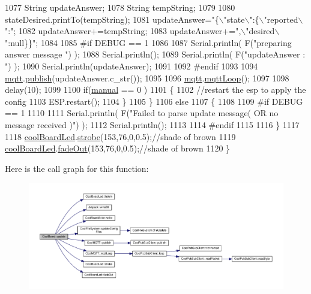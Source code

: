 \begin{DoxyCode}
1077             String updateAnswer;
1078             String tempString;
1079             
1080             stateDesired.printTo(tempString);
1081             updateAnswer=\textcolor{stringliteral}{"\{\(\backslash\)"state\(\backslash\)":\{\(\backslash\)"reported\(\backslash\)":"};
1082             updateAnswer+=tempString;
1083             updateAnswer+=\textcolor{stringliteral}{",\(\backslash\)"desired\(\backslash\)":null\}\}"};
1084 
1085 \textcolor{preprocessor}{        #if DEBUG == 1}
1086 
1087             Serial.println( F(\textcolor{stringliteral}{"preparing answer message "}) );
1088             Serial.println();
1089             Serial.println( F(\textcolor{stringliteral}{"updateAnswer : "}) );
1090             Serial.println(updateAnswer);
1091         
1092 \textcolor{preprocessor}{        #endif  }
1093 
1094             \hyperlink{class_cool_board_a2399f44d7c23c1149a335cb3b46d90f1}{mqtt}.\hyperlink{class_cool_m_q_t_t_ace977b3e90ab14b1199fe5c4fb0a13ec}{publish}(updateAnswer.c\_str());
1095             
1096             \hyperlink{class_cool_board_a2399f44d7c23c1149a335cb3b46d90f1}{mqtt}.\hyperlink{class_cool_m_q_t_t_aa5eaae967b562b62cbcf2b8d81f6e5d5}{mqttLoop}();
1097 
1098             delay(10);
1099         
1100             \textcolor{keywordflow}{if}(\hyperlink{class_cool_board_a7c8e505a5804b109e112d5a03df6ea2b}{manual} == 0 )
1101             \{
1102                 \textcolor{comment}{//restart the esp to apply the config}
1103                 ESP.restart();
1104             \}
1105     \}
1106     \textcolor{keywordflow}{else}
1107     \{
1108     
1109 \textcolor{preprocessor}{    #if DEBUG == 1}
1110 
1111         Serial.println( F(\textcolor{stringliteral}{"Failed to parse update message( OR no message received )"}) );
1112         Serial.println();
1113     
1114 \textcolor{preprocessor}{    #endif}
1115     
1116     \}
1117 
1118     \hyperlink{class_cool_board_a1b1d3c684a5baa56b08486e192fd8e97}{coolBoardLed}.\hyperlink{class_cool_board_led_ad5f0de4c628cbfbf49896042831c64ad}{strobe}(153,76,0,0.5);\textcolor{comment}{//shade of brown}
1119     \hyperlink{class_cool_board_a1b1d3c684a5baa56b08486e192fd8e97}{coolBoardLed}.\hyperlink{class_cool_board_led_a93d545679237e8cc858324367149775c}{fadeOut}(153,76,0,0.5);\textcolor{comment}{//shade of brown                              }
1120 \}
\end{DoxyCode}
Here is the call graph for this function\+:
\nopagebreak
\begin{figure}[H]
\begin{center}
\leavevmode
\includegraphics[width=350pt]{d7/df9/class_cool_board_a8612756d3f73198cdde857a66f0fe690_cgraph}
\end{center}
\end{figure}
